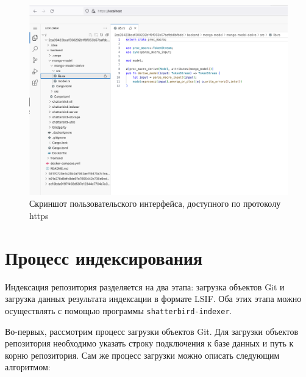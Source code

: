 \begin{figure}[H]
    \centering
    \includegraphics[width=\textwidth,height=0.5\textheight,keepaspectratio]{figures/intro.png}
    \caption{Скриншот пользовательского интерфейса, доступного по протоколу https}
\end{figure}

\section{Процесс индексирования}

Индексация репозитория разделяется на два этапа: загрузка объектов Git и загрузка данных результата индексации в формате LSIF. Оба этих этапа можно осуществлять с помощью программы \texttt{shatterbird-indexer}.

Во-первых, рассмотрим процесс загрузки объектов Git. Для загрузки объектов репозитория необходимо указать строку подключения к базе данных и путь к корню репозитория. Сам же процесс загрузки можно описать следующим алгоритмом:

